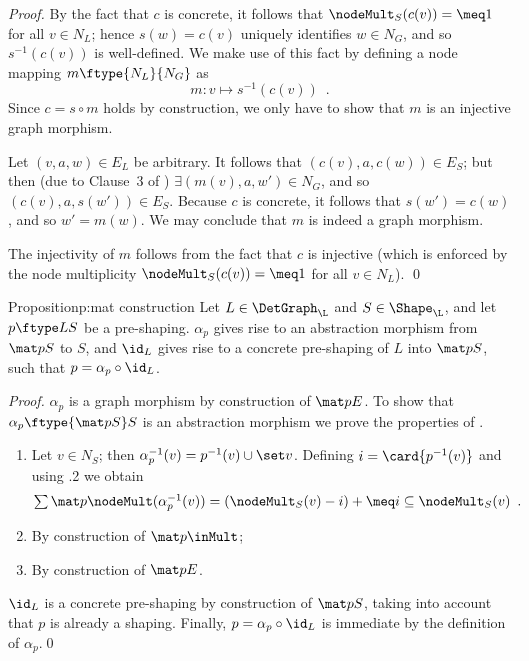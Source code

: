 \begin{proof}
By the fact that $c$ is concrete, it follows that
$\nodeMult_S(c(v))= \meq1$ for all $v\in N_L$; hence $s(w)=c(v)$ uniquely
identifies $w\in N_G$, and so $s^{-1}(c(v))$ is well-defined. We make use of
this fact by defining a node mapping $m\ftype{N_L}{N_G}$ as
%
\[ m : v \mapsto s^{-1}(c(v)) \enspace. \]
%
Since $c=s\circ m$ holds by construction, we only have to show that $m$ is an
injective graph morphism. 

Let $(v,a,w)\in E_L$ be arbitrary. It follows that $(c(v),a,c(w))\in E_S$; but
then (due to Clause~3 of ) $\exists(m(v),a,w')\in N_G$, and so
$(c(v),a,s(w'))\in E_S$. Because $c$ is concrete, it follows that $s(w')=c(w)$,
and so $w'=m(w)$. We may conclude that $m$ is indeed a graph morphism.

The injectivity of $m$ follows from the fact that $c$ is injective (which is
enforced by the node multiplicity $\nodeMult_S(c(v))= \meq1$ for all $v\in
N_L$). \qed
\end{proof}
%
\begin{oldresult}{Proposition}{p:mat construction}
  Let $L\in \DetGraph_\L$ and $S\in \Shape_\L$, and let $p\ftype L S$ be a
  pre-shaping. $\alpha_p$ gives rise to an abstraction morphism from $\mat p S$
  to $S$, and $\id_L$ gives rise to a concrete pre-shaping of $L$ into $\mat p
  S$, such that $p = \alpha_p\circ \id_L$.
\end{oldresult}
%
\begin{proof}$\alpha_p$ is a graph morphism by construction of $\mat p E$. To
  show that $\alpha_p\ftype{\mat p S}S$ is an abstraction morphism we prove the
  properties of .
%
\begin{enumerate}\noitemsep\notopsep
\item Let $v\in N_S$; then $\alpha^{-1}_p(v)=p^{-1}(v)\cup \set v$. Defining
  $i=\card{p^{-1}(v)}$ and using .2 we obtain \
  \[ \textstyle\sum\mat p \nodeMult(\alpha^{-1}_p(v))
         = (\nodeMult_S(v)-i)+\meq i
         \subseteq \nodeMult_S(v) \enspace.
  \]
\item By construction of $\mat p \inMult$;
\item By construction of $\mat p E$.
\end{enumerate}
%
$\id_L$ is a concrete pre-shaping by construction of $\mat p S$, taking into
account that $p$ is already a shaping. Finally, $p=\alpha_p\circ \id_L$ is
immediate by the definition of $\alpha_p$.\qed
\end{proof}
%
